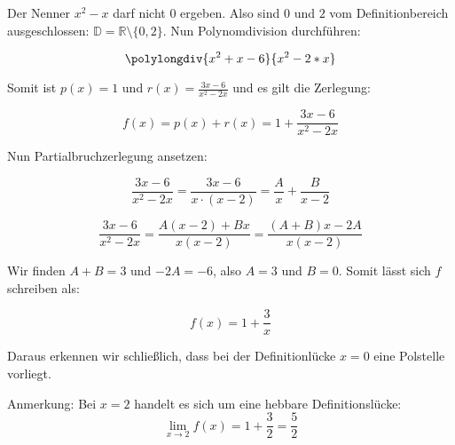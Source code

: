 \item Der Nenner $x^2-x$ darf nicht $0$ ergeben. Also sind $0$ und $2$ vom Definitionbereich ausgeschlossen: $\mathbb{D} = \mathbb{R} \setminus \{0,2\}$. Nun Polynomdivision durchführen:

\[\polylongdiv{x^2+x-6}{x^2-2*x}\]

Somit ist $p(x) = 1$ und $r(x) = \frac{3x-6}{x^2-2x}$ und es gilt die Zerlegung:

$$ f(x) = p(x) + r(x) = 1 + \frac{3x-6}{x^2-2x} $$

Nun Partialbruchzerlegung ansetzen:

$$ \frac{3x-6}{x^2-2x} = \frac{3x-6}{x\cdot(x-2)} = \frac{A}{x} + \frac{B}{x-2} $$

$$ \frac{3x-6}{x^2-2x} = \frac{A(x-2)+Bx}{x(x-2)} = \frac{(A+B)x-2A}{x(x-2)} $$

Wir finden $A+B = 3$ und $-2A=-6$, also $A=3$ und $B=0$. Somit lässt sich $f$ schreiben als:

$$ f(x) = 1 + \frac{3}{x} $$

Daraus erkennen wir schließlich, dass bei der Definitionlücke $x=0$ eine Polstelle vorliegt.

Anmerkung: Bei $x=2$ handelt es sich um eine hebbare Definitionslücke:\\
$$\lim\limits_{x\to 2} f(x) = 1+\frac{3}{2} = \frac{5}{2}$$
